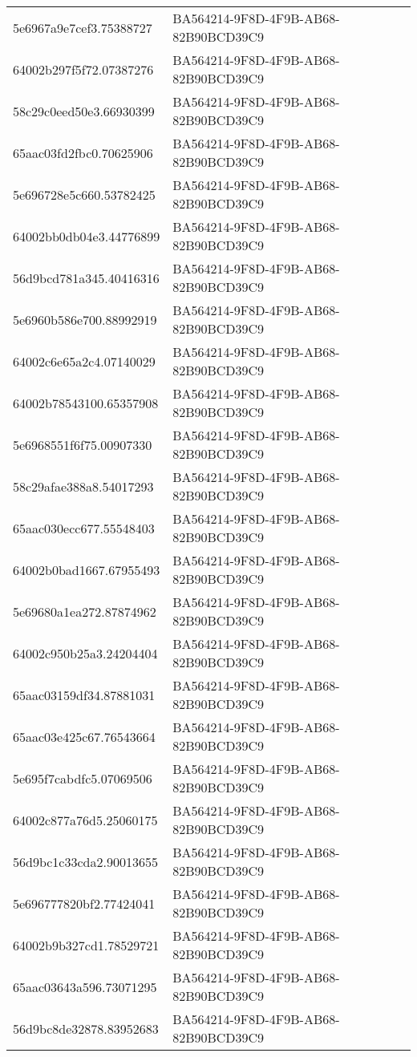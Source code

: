 \begin{tabular}{ll}
5e6967a9e7cef3.75388727 & BA564214-9F8D-4F9B-AB68-82B90BCD39C9 \\
64002b297f5f72.07387276 & BA564214-9F8D-4F9B-AB68-82B90BCD39C9 \\
58c29c0eed50e3.66930399 & BA564214-9F8D-4F9B-AB68-82B90BCD39C9 \\
65aac03fd2fbc0.70625906 & BA564214-9F8D-4F9B-AB68-82B90BCD39C9 \\
5e696728e5c660.53782425 & BA564214-9F8D-4F9B-AB68-82B90BCD39C9 \\
64002bb0db04e3.44776899 & BA564214-9F8D-4F9B-AB68-82B90BCD39C9 \\
56d9bcd781a345.40416316 & BA564214-9F8D-4F9B-AB68-82B90BCD39C9 \\
5e6960b586e700.88992919 & BA564214-9F8D-4F9B-AB68-82B90BCD39C9 \\
64002c6e65a2c4.07140029 & BA564214-9F8D-4F9B-AB68-82B90BCD39C9 \\
64002b78543100.65357908 & BA564214-9F8D-4F9B-AB68-82B90BCD39C9 \\
5e6968551f6f75.00907330 & BA564214-9F8D-4F9B-AB68-82B90BCD39C9 \\
58c29afae388a8.54017293 & BA564214-9F8D-4F9B-AB68-82B90BCD39C9 \\
65aac030ecc677.55548403 & BA564214-9F8D-4F9B-AB68-82B90BCD39C9 \\
64002b0bad1667.67955493 & BA564214-9F8D-4F9B-AB68-82B90BCD39C9 \\
5e69680a1ea272.87874962 & BA564214-9F8D-4F9B-AB68-82B90BCD39C9 \\
64002c950b25a3.24204404 & BA564214-9F8D-4F9B-AB68-82B90BCD39C9 \\
65aac03159df34.87881031 & BA564214-9F8D-4F9B-AB68-82B90BCD39C9 \\
65aac03e425c67.76543664 & BA564214-9F8D-4F9B-AB68-82B90BCD39C9 \\
5e695f7cabdfc5.07069506 & BA564214-9F8D-4F9B-AB68-82B90BCD39C9 \\
64002c877a76d5.25060175 & BA564214-9F8D-4F9B-AB68-82B90BCD39C9 \\
56d9bc1c33cda2.90013655 & BA564214-9F8D-4F9B-AB68-82B90BCD39C9 \\
5e696777820bf2.77424041 & BA564214-9F8D-4F9B-AB68-82B90BCD39C9 \\
64002b9b327cd1.78529721 & BA564214-9F8D-4F9B-AB68-82B90BCD39C9 \\
65aac03643a596.73071295 & BA564214-9F8D-4F9B-AB68-82B90BCD39C9 \\
56d9bc8de32878.83952683 & BA564214-9F8D-4F9B-AB68-82B90BCD39C9 \\

\end{tabular}
